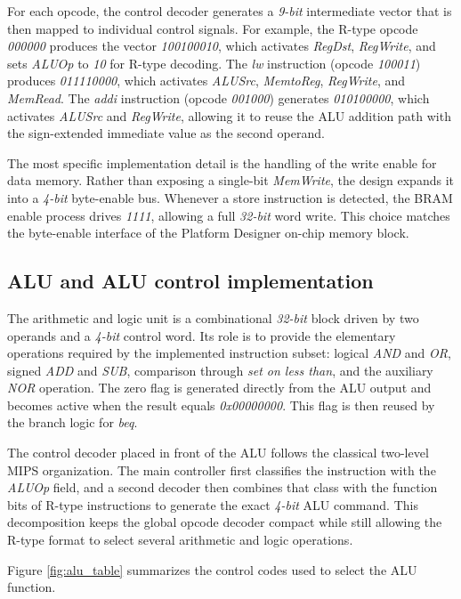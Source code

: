 \documentclass[a4paper,11pt]{scrartcl}
\begin{document}
For each opcode, the control decoder generates a \emph{9-bit} intermediate vector that is then mapped to individual control signals. For example, the R-type opcode \emph{000000} produces the vector \emph{100100010}, which activates \emph{RegDst}, \emph{RegWrite}, and sets \emph{ALUOp} to \emph{10} for R-type decoding. The \emph{lw} instruction (opcode \emph{100011}) produces \emph{011110000}, which activates \emph{ALUSrc}, \emph{MemtoReg}, \emph{RegWrite}, and \emph{MemRead}. The \emph{addi} instruction (opcode \emph{001000}) generates \emph{010100000}, which activates \emph{ALUSrc} and \emph{RegWrite}, allowing it to reuse the ALU addition path with the sign-extended immediate value as the second operand.

The most specific implementation detail is the handling of the write enable for data memory. Rather than exposing a single-bit \emph{MemWrite}, the design expands it into a \emph{4-bit} byte-enable bus. Whenever a store instruction is detected, the BRAM enable process drives \emph{1111}, allowing a full \emph{32-bit} word write. This choice matches the byte-enable interface of the Platform Designer on-chip memory block.
\subsection{ALU and ALU control implementation}
\label{sec:orgf699399}

The arithmetic and logic unit is a combinational \emph{32-bit} block driven by two operands and a \emph{4-bit} control word. Its role is to provide the elementary operations required by the implemented instruction subset: logical \emph{AND} and \emph{OR}, signed \emph{ADD} and \emph{SUB}, comparison through \emph{set on less than}, and the auxiliary \emph{NOR} operation. The zero flag is generated directly from the ALU output and becomes active when the result equals \emph{0x00000000}. This flag is then reused by the branch logic for \emph{beq}.

The control decoder placed in front of the ALU follows the classical two-level MIPS organization. The main controller first classifies the instruction with the \emph{ALUOp} field, and a second decoder then combines that class with the function bits of R-type instructions to generate the exact \emph{4-bit} ALU command. This decomposition keeps the global opcode decoder compact while still allowing the R-type format to select several arithmetic and logic operations.

Figure \ref{fig:alu_table} summarizes the control codes used to select the ALU function.
\end{document}
